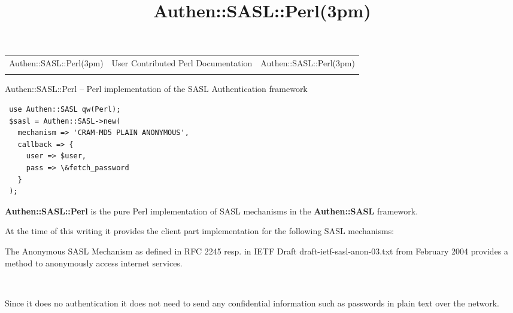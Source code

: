 \documentclass[]{article}
\title{Authen::SASL::Perl(3pm)}
\author{}
\date{}
\let\realtextbf=\textbf
\renewcommand{\textbf}[1]{\textcolor{boldcolor}{\realtextbf{#1}}}
\begin{document}
\maketitle

\begin{longtable}[c]{@{}lll@{}}
\toprule\addlinespace
Authen::SASL::Perl(3pm) & User Contributed Perl Documentation &
Authen::SASL::Perl(3pm)
\\\addlinespace
\bottomrule
\end{longtable}


Authen::SASL::Perl -- Perl implementation of the SASL Authentication
framework


\begin{verbatim}
 use Authen::SASL qw(Perl);
 $sasl = Authen::SASL->new(
   mechanism => 'CRAM-MD5 PLAIN ANONYMOUS',
   callback => {
     user => $user,
     pass => \&fetch_password
   }
 );
\end{verbatim}


\textbf{Authen::SASL::Perl} is the pure Perl implementation of SASL
mechanisms in the \textbf{Authen::SASL} framework.

At the time of this writing it provides the client part implementation
for the following SASL mechanisms:

\begin{description}
\itemsep1pt\parskip0pt
\item[ANONYMOUS]
The Anonymous SASL Mechanism as defined in RFC 2245 resp. in IETF Draft
draft-ietf-sasl-anon-03.txt from February 2004 provides a method to
anonymously access internet services.

~

Since it does no authentication it does not need to send any
confidential information such as passwords in plain text over the
network.
\end{description}
\end{document}
